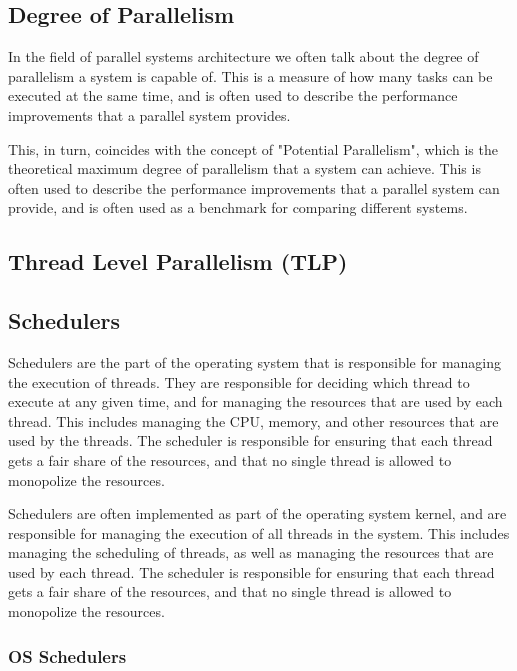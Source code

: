 \documentclass[12pt,a4paper]{article}
\begin{document}
\subsection{Degree of Parallelism}

In the field of parallel systems architecture we often talk about the degree of parallelism a system is capable of. This is a measure of how many tasks can be executed at the same time, and is often used to describe the performance improvements that a parallel system provides.

This, in turn, coincides with the concept of "Potential Parallelism", which is the theoretical maximum degree of parallelism that a system can achieve. This is often used to describe the performance improvements that a parallel system can provide, and is often used as a benchmark for comparing different systems.

\subsection{Thread Level Parallelism (TLP)}

\subsection{Schedulers}

Schedulers are the part of the operating system that is responsible for managing the execution of threads. They are responsible for deciding which thread to execute at any given time, and for managing the resources that are used by each thread. This includes managing the CPU, memory, and other resources that are used by the threads. The scheduler is responsible for ensuring that each thread gets a fair share of the resources, and that no single thread is allowed to monopolize the resources.

Schedulers are often implemented as part of the operating system kernel, and are responsible for managing the execution of all threads in the system. This includes managing the scheduling of threads, as well as managing the resources that are used by each thread. The scheduler is responsible for ensuring that each thread gets a fair share of the resources, and that no single thread is allowed to monopolize the resources.

\subsubsection{OS Schedulers}
\end{document}
